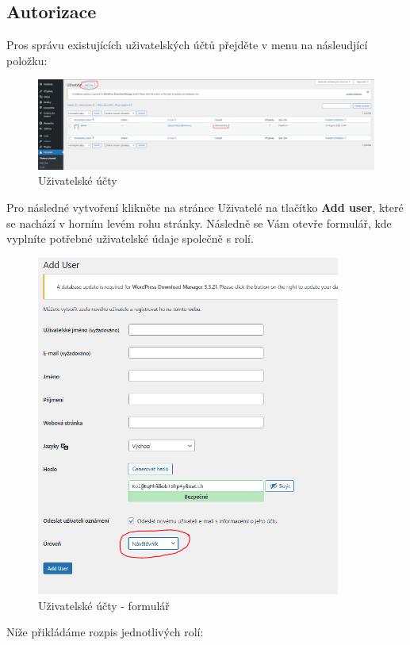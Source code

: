 \documentclass[12pt,a4paper]{article}
\begin{document}
	
	\subsection{Autorizace}
	Pros správu existujících uživatelských účtů přejděte v menu na násleudjící položku:
	
		
	\begin{figure}[htp]
		\centering
		\includegraphics[width=15cm]{WPuzivatele.png}
		\caption{Uživatelské účty}
		\label{fig:role}
	\end{figure}
	
	
	Pro následné vytvoření klikněte na stránce Uživatelé na tlačítko \textbf{Add user}, které se nachází v horním levém rohu stránky. Následně se Vám otevře formulář, kde vyplníte potřebné uživatelské údaje společně s rolí.
	
	\begin{figure}[htp]
		\centering
		\includegraphics[width=10cm]{WPcreateuser.png}
		\caption{Uživatelské účty - formulář}
		\label{fig:role}
	\end{figure}
	
	\newpage
	Níže přikládáme rozpis jednotlivých rolí:	
	
\end{document}
